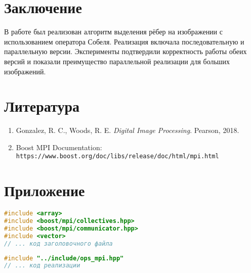 \documentclass[12pt]{article}
\begin{document}
\newpage
\section*{Заключение}
В работе был реализован алгоритм выделения рёбер на изображении с использованием оператора Собеля. Реализация включала последовательную и параллельную версии. Эксперименты подтвердили корректность работы обеих версий и показали преимущество параллельной реализации для больших изображений.

\newpage
\section*{Литература}
\begin{enumerate}
    \item Gonzalez, R. C., Woods, R. E. \textit{Digital Image Processing}. Pearson, 2018.
    \item Boost MPI Documentation: \texttt{https://www.boost.org/doc/libs/release/doc/html/mpi.html}
\end{enumerate}

\newpage
\section*{Приложение}
\begin{lstlisting}[language=C++,caption={Заголовочный файл Sobel},label={lst:header}]
#include <array>
#include <boost/mpi/collectives.hpp>
#include <boost/mpi/communicator.hpp>
#include <vector>
// ... код заголовочного файла
\end{lstlisting}
\begin{lstlisting}[language=C++,caption={Реализация Sobel},label={lst:implementation}]
#include "../include/ops_mpi.hpp"
// ... код реализации
\end{lstlisting}
\end{document}
